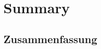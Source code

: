 \begingroup
\let\clearpage\relax
\let\cleardoublepage\relax
\let\cleardoublepage\relax

\chapter*{Summary}

\lipsum


\endgroup

\cleardoublepage%

\begingroup
\let\clearpage\relax
\let\cleardoublepage\relax
\let\cleardoublepage\relax

\begin{otherlanguage}{ngerman}
\chapter*{Zusammenfassung}

\lipsum

\end{otherlanguage}

\endgroup

\vfill